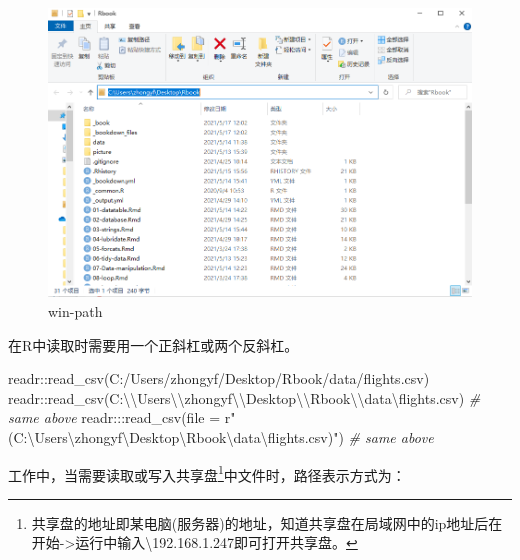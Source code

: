 \documentclass[
]{book}
\newenvironment{Shaded}{\begin{snugshade}}{\end{snugshade}}
\newcommand{\AttributeTok}[1]{\textcolor[rgb]{0.77,0.63,0.00}{#1}}
\newcommand{\CommentTok}[1]{\textcolor[rgb]{0.56,0.35,0.01}{\textit{#1}}}
\newcommand{\FunctionTok}[1]{\textcolor[rgb]{0.00,0.00,0.00}{#1}}
\newcommand{\NormalTok}[1]{#1}
\newcommand{\SpecialCharTok}[1]{\textcolor[rgb]{0.00,0.00,0.00}{#1}}
\newcommand{\StringTok}[1]{\textcolor[rgb]{0.31,0.60,0.02}{#1}}
\begin{document}
\begin{figure}
\centering
\includegraphics{picture/read-write/win-path.png}
\caption{win-path}
\end{figure}

在R中读取时需要用一个正斜杠或两个反斜杠。

\begin{Shaded}
\begin{Highlighting}[]
\NormalTok{readr}\SpecialCharTok{::}\FunctionTok{read\_csv}\NormalTok{(}\StringTok{\textquotesingle{}C:/Users/zhongyf/Desktop/Rbook/data/flights.csv\textquotesingle{}}\NormalTok{)}
\NormalTok{readr}\SpecialCharTok{::}\FunctionTok{read\_csv}\NormalTok{(}\StringTok{\textquotesingle{}C:}\SpecialCharTok{\textbackslash{}\textbackslash{}}\StringTok{Users}\SpecialCharTok{\textbackslash{}\textbackslash{}}\StringTok{zhongyf}\SpecialCharTok{\textbackslash{}\textbackslash{}}\StringTok{Desktop}\SpecialCharTok{\textbackslash{}\textbackslash{}}\StringTok{Rbook}\SpecialCharTok{\textbackslash{}\textbackslash{}}\StringTok{data}\SpecialCharTok{\textbackslash{}f}\StringTok{lights.csv\textquotesingle{}}\NormalTok{) }\CommentTok{\# same above}
\NormalTok{readr}\SpecialCharTok{:::}\FunctionTok{read\_csv}\NormalTok{(}\AttributeTok{file =}\NormalTok{ r}\StringTok{"(C:\textbackslash{}Users\textbackslash{}zhongyf\textbackslash{}Desktop\textbackslash{}Rbook\textbackslash{}data}\SpecialCharTok{\textbackslash{}f}\StringTok{lights.csv)"}\NormalTok{) }\CommentTok{\# same above}
\end{Highlighting}
\end{Shaded}

工作中，当需要读取或写入共享盘\footnote{共享盘的地址即某电脑(服务器)的地址，知道共享盘在局域网中的ip地址后在 开始-\textgreater 运行中输入\textbackslash192.168.1.247即可打开共享盘。}中文件时，路径表示方式为：
\end{document}
